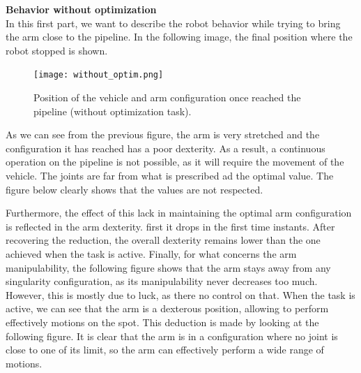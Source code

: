 \documentclass{article}
\begin{document}
{\large \textbf{Behavior without optimization}} \\
In this first part, we want to describe the robot behavior while trying to bring the arm close to the pipeline. In the following image, the final position where the robot stopped is shown. \\
\begin{figure}[H]
	\centering
	{\texttt{[image: without\_optim.png]}}
	\caption{Position of the vehicle and arm configuration once reached the pipeline (without optimization task).}
	\label{im:without_optim}
\end{figure}
As we can see from the previous figure, the arm is very stretched and the configuration it has reached has a poor dexterity. As a result, a continuous operation on the pipeline is not possible, as it will require the movement of the vehicle. 
The joints are far from what is prescribed ad the optimal value. The figure below clearly shows that the values are not respected. 
\begin{figure}[H]
	\centering
	\hspace{10mm}
	\hspace{10mm}
	\label{im:Without_optim_results}
\end{figure} 
Furthermore, the effect of this lack in maintaining the optimal arm configuration is reflected in the arm dexterity. first it drops in the first time instants. After recovering the reduction, the overall dexterity remains lower than the one achieved when the task is active. Finally, for what concerns the arm manipulability, the following figure shows that the arm stays away from any singularity configuration, as its manipulability never decreases too much. However, this is mostly due to luck, as there no control on that. When the task is active, we can see that the arm is a dexterous position, allowing to perform effectively motions on the spot. This deduction is made by looking at the following figure. It is clear that the arm is in a configuration where no joint is close to one of its limit, so the arm can effectively perform a wide range of motions. \\
\end{document}
